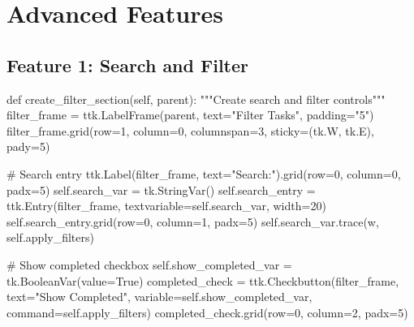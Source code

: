 \documentclass[
  letterpaper,
  DIV=11,
  numbers=noendperiod,
  oneside]{scrreprt}
\newenvironment{Shaded}{}{}
\newcommand{\CommentTok}[1]{\textcolor[rgb]{0.42,0.45,0.49}{#1}}
\newcommand{\DecValTok}[1]{\textcolor[rgb]{0.00,0.36,0.77}{#1}}
\newcommand{\KeywordTok}[1]{\textcolor[rgb]{0.84,0.23,0.29}{#1}}
\newcommand{\NormalTok}[1]{\textcolor[rgb]{0.14,0.16,0.18}{#1}}
\newcommand{\OperatorTok}[1]{\textcolor[rgb]{0.14,0.16,0.18}{#1}}
\newcommand{\StringTok}[1]{\textcolor[rgb]{0.01,0.18,0.38}{#1}}
\newcommand{\VariableTok}[1]{\textcolor[rgb]{0.89,0.38,0.04}{#1}}
\begin{document}
\section{Advanced Features}\label{advanced-features-3}

\subsection{Feature 1: Search and
Filter}\label{feature-1-search-and-filter}

\begin{Shaded}
\begin{Highlighting}[]
\KeywordTok{def}\NormalTok{ create\_filter\_section(}\VariableTok{self}\NormalTok{, parent):}
    \CommentTok{"""Create search and filter controls"""}
\NormalTok{    filter\_frame }\OperatorTok{=}\NormalTok{ ttk.LabelFrame(parent, text}\OperatorTok{=}\StringTok{"Filter Tasks"}\NormalTok{, padding}\OperatorTok{=}\StringTok{"5"}\NormalTok{)}
\NormalTok{    filter\_frame.grid(row}\OperatorTok{=}\DecValTok{1}\NormalTok{, column}\OperatorTok{=}\DecValTok{0}\NormalTok{, columnspan}\OperatorTok{=}\DecValTok{3}\NormalTok{, sticky}\OperatorTok{=}\NormalTok{(tk.W, tk.E), pady}\OperatorTok{=}\DecValTok{5}\NormalTok{)}
    
    \CommentTok{\# Search entry}
\NormalTok{    ttk.Label(filter\_frame, text}\OperatorTok{=}\StringTok{"Search:"}\NormalTok{).grid(row}\OperatorTok{=}\DecValTok{0}\NormalTok{, column}\OperatorTok{=}\DecValTok{0}\NormalTok{, padx}\OperatorTok{=}\DecValTok{5}\NormalTok{)}
    \VariableTok{self}\NormalTok{.search\_var }\OperatorTok{=}\NormalTok{ tk.StringVar()}
    \VariableTok{self}\NormalTok{.search\_entry }\OperatorTok{=}\NormalTok{ ttk.Entry(filter\_frame, textvariable}\OperatorTok{=}\VariableTok{self}\NormalTok{.search\_var, width}\OperatorTok{=}\DecValTok{20}\NormalTok{)}
    \VariableTok{self}\NormalTok{.search\_entry.grid(row}\OperatorTok{=}\DecValTok{0}\NormalTok{, column}\OperatorTok{=}\DecValTok{1}\NormalTok{, padx}\OperatorTok{=}\DecValTok{5}\NormalTok{)}
    \VariableTok{self}\NormalTok{.search\_var.trace(}\StringTok{\textquotesingle{}w\textquotesingle{}}\NormalTok{, }\VariableTok{self}\NormalTok{.apply\_filters)}
    
    \CommentTok{\# Show completed checkbox}
    \VariableTok{self}\NormalTok{.show\_completed\_var }\OperatorTok{=}\NormalTok{ tk.BooleanVar(value}\OperatorTok{=}\VariableTok{True}\NormalTok{)}
\NormalTok{    completed\_check }\OperatorTok{=}\NormalTok{ ttk.Checkbutton(filter\_frame, text}\OperatorTok{=}\StringTok{"Show Completed"}\NormalTok{,}
\NormalTok{                                     variable}\OperatorTok{=}\VariableTok{self}\NormalTok{.show\_completed\_var,}
\NormalTok{                                     command}\OperatorTok{=}\VariableTok{self}\NormalTok{.apply\_filters)}
\NormalTok{    completed\_check.grid(row}\OperatorTok{=}\DecValTok{0}\NormalTok{, column}\OperatorTok{=}\DecValTok{2}\NormalTok{, padx}\OperatorTok{=}\DecValTok{5}\NormalTok{)}
    

\end{Highlighting}
\end{Shaded}
\end{document}
